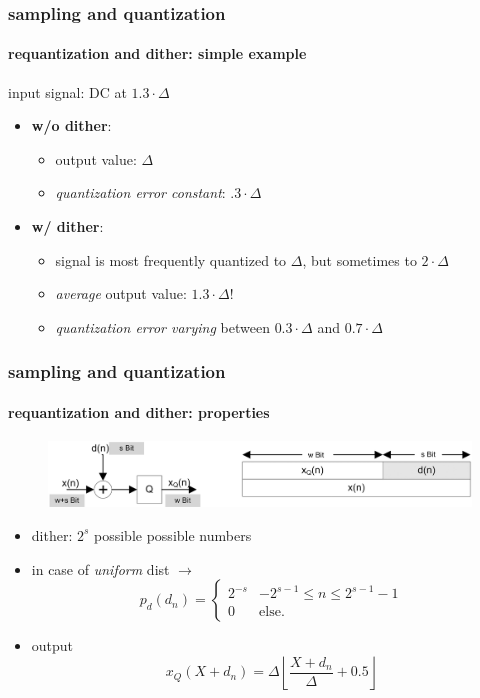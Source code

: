 	\begin{frame}\frametitle{sampling and quantization}\framesubtitle{requantization and dither: simple example}
		input signal: DC at $1.3\cdot\Delta$
        \bigskip
		\begin{itemize}
			\item	\textbf{w/o dither}: 
				\begin{itemize}
					\item	output value: $\Delta$
					\item	\textit{quantization error constant}: $.3\cdot\Delta$
				\end{itemize}
			\pause
            \bigskip
			\item	\textbf{w/ dither}: 
				\begin{itemize}
					\item	signal is most frequently quantized to $\Delta$, but sometimes to $2\cdot\Delta$
					\item	\textit{average} output value: $1.3\cdot\Delta$!
                    \item   \textit{quantization error varying} between $0.3\cdot\Delta$ and $0.7\cdot\Delta$
				\end{itemize}
		\end{itemize}
	\end{frame}	
	\begin{frame}\frametitle{sampling and quantization}\framesubtitle{requantization and dither: properties}
		\begin{figure}
			\centering
				\includegraphics[scale=0.9]{Graph/quantisierung_mit_dither.png}
		\end{figure}
        \pause
        \begin{itemize}
            \item   dither: $2^s$ possible possible numbers
            \pause
            \item   in case of \textit{uniform} dist  $\rightarrow$
            \begin{equation*}
                 p_d(d_n) = \left\lbrace \begin{array}{ll}
                    2^{-s} & -2^{s-1}\leq n \leq 2^{s-1}-1\\
                    0 & \text{else}.
                \end{array}\right.
            \end{equation*}
            \pause
            \item   output
            \begin{equation*}
                x_Q(X + d_n) = \Delta\left\lfloor \frac{X + d_n}{\Delta} + 0.5 \right\rfloor
            \end{equation*}
        \end{itemize}
	\end{frame}	
